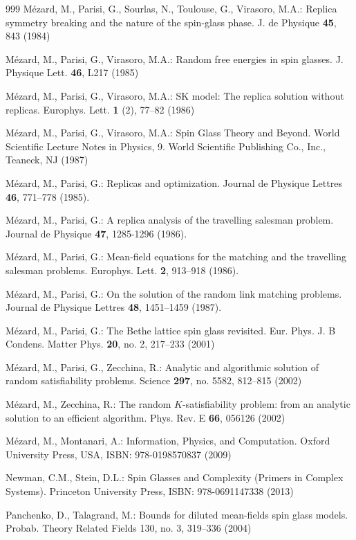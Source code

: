\documentclass[12pt]{article}
\theoremstyle{nonumberplain}
\begin{document}
\begin{thebibliography}{999}
 M\'ezard, M., Parisi, G., Sourlas, N., Toulouse, G., Virasoro, M.A.: Replica symmetry breaking and the nature of the spin-glass phase. J. de Physique \textbf{45}, 843 (1984)

 M\'ezard, M., Parisi, G., Virasoro, M.A.: Random free energies in spin glasses. J. Physique Lett. \textbf{46}, L217 (1985)

 M\'ezard, M., Parisi, G., Virasoro, M.A.: SK model: The replica solution without replicas. Europhys. Lett. \textbf{1} (2), 77--82 (1986)

 M\'ezard, M., Parisi, G., Virasoro, M.A.: Spin Glass Theory and Beyond. World Scientific Lecture Notes in Physics, 9. World Scientific Publishing Co., Inc., Teaneck, NJ (1987) 

 M\'ezard, M., Parisi, G.: Replicas and optimization. Journal de Physique Lettres \textbf{46}, 771--778 (1985).

 M\'ezard, M., Parisi, G.: A replica analysis of the travelling salesman problem. Journal de Physique \textbf{47}, 1285-1296 (1986).

 M\'ezard, M., Parisi, G.: Mean-field equations for the matching and the travelling salesman problems. Europhys. Lett. \textbf{2}, 913--918 (1986).

 M\'ezard, M., Parisi, G.: On the solution of the random link matching problems. Journal de Physique Lettres \textbf{48}, 1451--1459 (1987).

 M\'ezard, M., Parisi, G.: The Bethe lattice spin glass revisited. Eur. Phys. J. B Condens. Matter Phys. \textbf{20}, no. 2, 217--233 (2001)

 M\'ezard, M., Parisi, G., Zecchina, R.: Analytic and algorithmic solution of random satisfiability problems. Science \textbf{297}, no. 5582, 812--815 (2002)

 M\'ezard, M., Zecchina, R.: The random $K$-satisfiability problem: from an analytic solution to an efficient algorithm. Phys. Rev. E \textbf{66}, 056126 (2002)

 M\'ezard, M., Montanari, A.: Information, Physics, and Computation. Oxford University Press, USA, ISBN: 978-0198570837 (2009)

 Newman, C.M., Stein, D.L.: Spin Glasses and Complexity (Primers in Complex Systems). Princeton University Press, ISBN: 978-0691147338 (2013) 

 Panchenko, D., Talagrand, M.: Bounds for diluted mean-fields spin glass models. Probab. Theory Related Fields 130,  no. 3, 319--336 (2004) 


\end{thebibliography}
\end{document}

